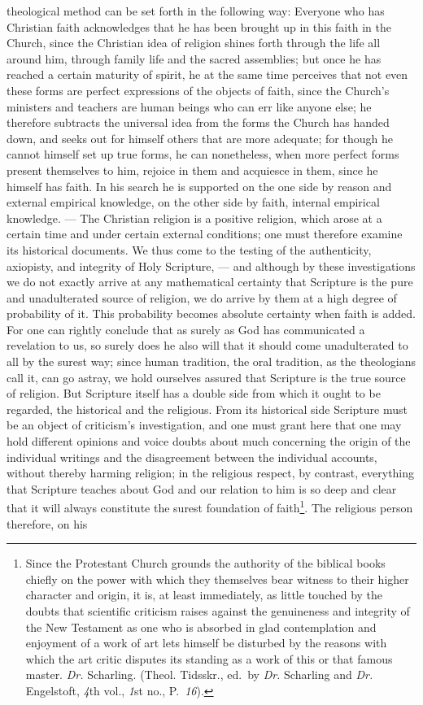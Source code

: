 \documentclass[12pt]{book}
\newcommand{\opage}[1]{\marginnote{\footnotesize\textit{[#1]}}}
\begin{document}
theological method can
\opage{100} be set forth in the following way: Everyone who has Christian faith
acknowledges that he has been brought up in this faith in the Church, since the
Christian idea of religion shines forth through the life all around him,
through family life and the sacred assemblies; but once he has reached a
certain maturity of spirit, he at the same time perceives that not even these
forms are perfect expressions of the objects of faith, since the Church's
ministers and teachers are human beings who can err like anyone else; he
therefore subtracts the universal idea from the forms the Church has handed
down, and seeks out for himself others that are more adequate; for though he
cannot himself set up true forms, he can nonetheless, when more perfect forms
present themselves to him, rejoice in them and acquiesce in them, since he
himself has faith. In his search he is supported on the one side by reason and
external empirical knowledge, on the other side by faith, internal empirical
knowledge. --- The Christian religion is a positive religion, which arose at a
certain time and under certain external conditions; one must therefore examine
its historical documents. We thus come to the testing of the authenticity,
axiopisty, and integrity of Holy Scripture, --- and although by these
investigations we do not exactly arrive at any mathematical certainty that
Scripture is the pure and unadulterated source of religion, we do arrive by
them at a high degree of probability of it. This probability becomes absolute
certainty when faith is added. For one can rightly conclude that as surely as
God has communicated a revelation to us, so surely does he also will that it
should come unadulterated to all by the surest way; since human tradition, the
oral tradition, as the theologians call it, can go astray, we hold ourselves
assured that Scripture is the true source of religion. But Scripture itself has
a double side from which it ought to be regarded, the historical and the
religious. From its historical side
\opage{101} \setcounter{footnote}{0}%
Scripture must be an object of criticism's investigation, and one must grant
here that one may hold different opinions and voice doubts about much
concerning the origin of the individual writings and the disagreement between
the individual accounts, without thereby harming religion; in the religious
respect, by contrast, everything that Scripture teaches about God and our
relation to him is so deep and clear that it will always constitute the surest
foundation of faith\footnote{Since the Protestant Church grounds the authority
of the biblical books chiefly on the power with which they themselves bear
witness to their higher character and origin, it is, at least immediately, as
little touched by the doubts that scientific criticism raises against the
genuineness and integrity of the New Testament as one who is absorbed in glad
contemplation and enjoyment of a work of art lets himself be disturbed by the
reasons with which the art critic disputes its standing as a work of this or
that famous master. \textit{Dr.} Scharling. (Theol. Tidsskr., ed.\ by
\textit{Dr.} Scharling and \textit{Dr.} Engelstoft, \textit{4}th vol.,
\textit{1}st no., P.~\textit{16}).}. The religious person therefore, on his
\end{document}
